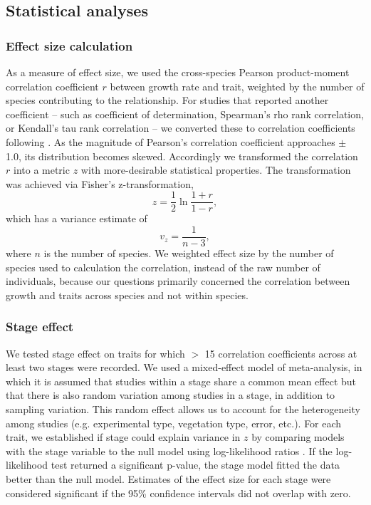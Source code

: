 \documentclass[a4paper,11pt]{article}
\begin{document}
\subsection*{Statistical analyses}\label{statistical-analyses}

\subsubsection*{Effect size calculation}\label{effect-size}

As a measure of effect size, we used the cross-species Pearson product-moment correlation coefficient $r$ between growth rate and trait, weighted by the number of species contributing to the relationship. For studies that reported another coefficient -- such as coefficient of determination, Spearman's rho rank correlation, or Kendall's tau rank correlation -- we converted these to correlation coefficients following \citet{Lajeunesse:2013tm}. As the magnitude of Pearson's correlation coefficient approaches $\pm$ 1.0, its distribution becomes skewed. Accordingly we transformed the correlation $r$ into a metric $z$ with more-desirable statistical properties. The transformation was achieved via Fisher's z-transformation,
\[ z = \frac{1}{2} \ln \frac{1+r}{1-r}, \]
which has a variance estimate of
\[ v_z= \frac{1}{n-3}, \]
where $n$ is the number of species. We weighted effect size by the number of species used to calculation the correlation, instead of the raw number of individuals, because our questions primarily concerned the correlation between growth and traits across species and not within species.

\subsubsection*{Stage effect}\label{stage-effect}

We tested stage effect on traits for which $>$ 15 correlation coefficients across at least two stages were recorded. We used a mixed-effect model of meta-analysis, in which it is assumed that studies within a stage share a common mean effect but that there is also random variation among studies in a stage, in addition to sampling variation. This random effect allows us to account for the heterogeneity among studies (e.g. experimental type, vegetation type, error, etc.). For each trait, we established if stage could explain variance in $z$ by comparing models with the stage variable to the null model using log-likelihood ratios \citep{Zuur:2009cfa}. If the log-likelihood test returned a significant p-value, the stage model fitted the data better than the null model. Estimates of the effect size for each stage were considered significant if the 95\% confidence intervals did not overlap with zero.
\end{document}
